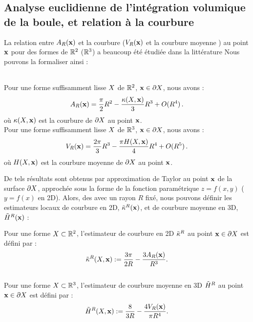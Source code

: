 \subsection{Analyse euclidienne de l'intégration volumique de la boule, et relation à la courbure}
\label{sec:pottmann-principle}
%
La relation entre $A_R(\mathbf{x})$ et la courbure (\resp $V_R(\mathbf{x})$ et la courbure
moyenne ) au point $\mathbf{x}$ pour des formes de $\mathbb{R}^2$ (\respp $\mathbb{R}^3$) a beaucoup
été étudiée dans la littérature \cite{Bullard1995,Pottmann2007,Pottmann2009}
Nous pouvons la formaliser ainsi :
%
\begin{lemma}{\textbf{\cite{Pottmann2009}}}\\
\label{lem:pottmann-2d}
  Pour une forme suffisamment lisse $X$ de $\mathbb{R}^2$, $\mathbf{x} \in \partial X$, nous
  avons :
  \begin{equation}
    \label{eq:volume2d}
    A_R(\mathbf{x}) = \frac{\pi}{2} R^2 - \frac{\kappa(X,\mathbf{x})}{3}R^3 + O(R^4)\,.
  \end{equation}
  où $\kappa(X,\mathbf{x})$ est la courbure de $\partial X$ au point $\mathbf{x}$.
  \\
  Pour une forme suffisamment lisse $X$ de $\mathbb{R}^3$, $\mathbf{x} \in \partial X$, nous
  avons :
  \begin{equation}
    \label{eq:volume3d}
    V_R(\mathbf{x}) = \frac{2\pi}{3} R^3 - \frac{\pi H(X,\mathbf{x})}{4}R^4 + O(R^5)\,.
  \end{equation}
  où $H(X,\mathbf{x})$ est la courbure moyenne de $\partial X$ au point $\mathbf{x}$.
\end{lemma}
%
De tels résultats sont obtenus par approximation de Taylor au point $\mathbf{x}$ de la
surface $\partial X$, approchée sous la forme de la fonction paramétrique $z=f(x,y)$ ($y=f(x)$ en
2D). Alors, des  avec un
rayon $R$ fixé, nous pouvons définir les estimateurs locaux de courbure en 2D,
$\tilde{\kappa}^{R}(\mathbf{x})$, et de courbure moyenne en 3D, $\tilde{H}^{R}(\mathbf{x})$ :
%
\begin{definition}{}
  \label{def:pottmann-2d-3d-mean}
  Pour une forme $X \subset \mathbb{R}^2$, l'estimateur de courbure en 2D $\tilde{\kappa}^{R}$
  au point $\mathbf{x} \in \partial X$ est défini par :
  \begin{equation}
    \label{eq:pottmann-2d}
    \tilde{\kappa}^{R}(X,\mathbf{x}) := \frac{3\pi}{2 R} - \frac{3 A_R(\mathbf{x})}{R^3} .
  \end{equation}
  \\
  Pour une forme $X \subset \mathbb{R}^3$, l'estimateur de courbure moyenne en 3D
  $\tilde{H}^{R}$ au point $\mathbf{x} \in \partial X$ est défini par :
  \begin{equation}
    \label{eq:pottmann-3d-mean}
    \tilde{H}^{R}(X,\mathbf{x}) := \frac{8}{3 R} - \frac{4 V_R(\mathbf{x})}{\pi R^4}.
  \end{equation}
\end{definition}

